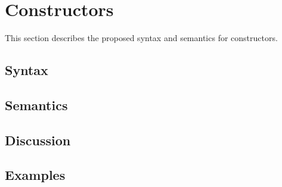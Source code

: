 \section{Constructors}
\label{Constructors}

This section describes the proposed syntax and semantics for constructors.

\subsection{Syntax}

\subsection{Semantics}

\subsection{Discussion}

\subsection{Examples}

